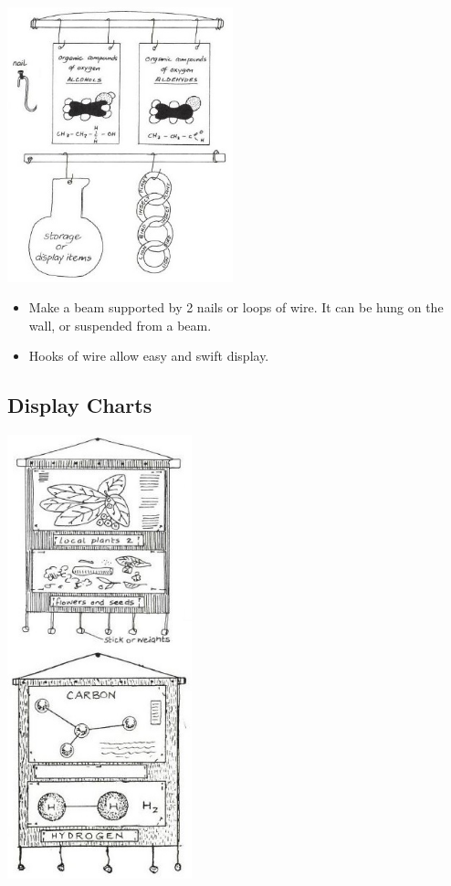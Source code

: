 \begin{multicols}{2}
\begin{center}
\includegraphics[width=0.49\textwidth]{./img/vso/display-beams-hooks.jpg}
\end{center}

\begin{itemize}
\item Make a beam supported by 2 nails or loops of wire.
It can be hung on the wall, or suspended from a beam.
\item Hooks of wire allow easy and swift display.
\end{itemize}

\subsection{Display Charts}

\begin{center}
\includegraphics[width=0.4\textwidth]{./img/vso/display-charts-alt.jpg}
\end{center}


\end{multicols}

